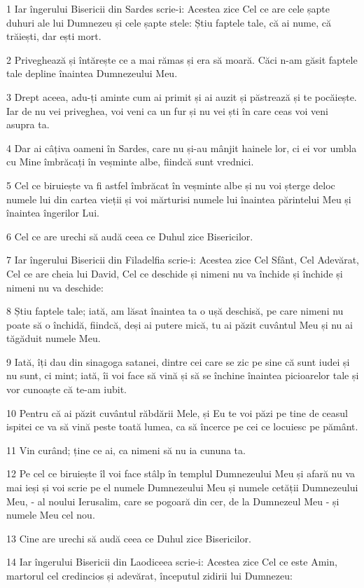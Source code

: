 \par 1 Iar îngerului Bisericii din Sardes scrie-i: Acestea zice Cel ce are cele șapte duhuri ale lui Dumnezeu și cele șapte stele: Știu faptele tale, că ai nume, că trăiești, dar ești mort.
\par 2 Priveghează și întărește ce a mai rămas și era să moară. Căci n-am găsit faptele tale depline înaintea Dumnezeului Meu.
\par 3 Drept aceea, adu-ți aminte cum ai primit și ai auzit și păstrează și te pocăiește. Iar de nu vei priveghea, voi veni ca un fur și nu vei ști în care ceas voi veni asupra ta.
\par 4 Dar ai câțiva oameni în Sardes, care nu și-au mânjit hainele lor, ci ei vor umbla cu Mine îmbrăcați în veșminte albe, fiindcă sunt vrednici.
\par 5 Cel ce biruiește va fi astfel îmbrăcat în veșminte albe și nu voi șterge deloc numele lui din cartea vieții și voi mărturisi numele lui înaintea părintelui Meu și înaintea îngerilor Lui.
\par 6 Cel ce are urechi să audă ceea ce Duhul zice Bisericilor.
\par 7 Iar îngerului Bisericii din Filadelfia scrie-i: Acestea zice Cel Sfânt, Cel Adevărat, Cel ce are cheia lui David, Cel ce deschide și nimeni nu va închide și închide și nimeni nu va deschide:
\par 8 Știu faptele tale; iată, am lăsat înaintea ta o ușă deschisă, pe care nimeni nu poate să o închidă, fiindcă, deși ai putere mică, tu ai păzit cuvântul Meu și nu ai tăgăduit numele Meu.
\par 9 Iată, îți dau din sinagoga satanei, dintre cei care se zic pe sine că sunt iudei și nu sunt, ci mint; iată, îi voi face să vină și să se închine înaintea picioarelor tale și vor cunoaște că te-am iubit.
\par 10 Pentru că ai păzit cuvântul răbdării Mele, și Eu te voi păzi pe tine de ceasul ispitei ce va să vină peste toată lumea, ca să încerce pe cei ce locuiesc pe pământ.
\par 11 Vin curând; ține ce ai, ca nimeni să nu ia cununa ta.
\par 12 Pe cel ce biruiește îl voi face stâlp în templul Dumnezeului Meu și afară nu va mai ieși și voi scrie pe el numele Dumnezeului Meu și numele cetății Dumnezeului Meu, - al noului Ierusalim, care se pogoară din cer, de la Dumnezeul Meu - și numele Meu cel nou.
\par 13 Cine are urechi să audă ceea ce Duhul zice Bisericilor.
\par 14 Iar îngerului Bisericii din Laodiceea scrie-i: Acestea zice Cel ce este Amin, martorul cel credincios și adevărat, începutul zidirii lui Dumnezeu:
